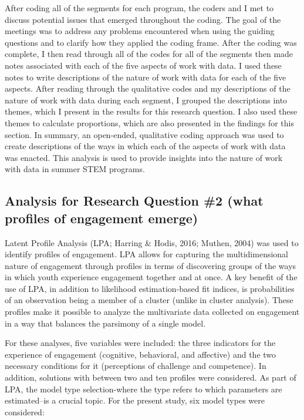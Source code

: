 \documentclass[]{book}
\theoremstyle{definition}
\theoremstyle{definition}
\theoremstyle{definition}
\theoremstyle{remark}
\begin{document}
After coding all of the segments for each program, the coders and I met
to discuss potential issues that emerged throughout the coding. The goal
of the meetings was to address any problems encountered when using the
guiding questions and to clarify how they applied the coding frame.
After the coding was complete, I then read through all of the codes for
all of the segments then made notes associated with each of the five
aspects of work with data. I used these notes to write descriptions of
the nature of work with data for each of the five aspects. After reading
through the qualitative codes and my descriptions of the nature of work
with data during each segment, I grouped the descriptions into themes,
which I present in the results for this research question. I also used
these themes to calculate proportions, which are also presented in the
findings for this section. In summary, an open-ended, qualitative coding
approach was used to create descriptions of the ways in which each of
the aspects of work with data was enacted. This analysis is used to
provide insights into the nature of work with data in summer STEM
programs.

\subsection{Analysis for Research Question \#2 (what profiles of
engagement
emerge)}\label{analysis-for-research-question-2-what-profiles-of-engagement-emerge}

Latent Profile Analysis (LPA; Harring \& Hodis, 2016; Muthen, 2004) was
used to identify profiles of engagement. LPA allows for capturing the
multidimensional nature of engagement through profiles in terms of
discovering groups of the ways in which youth experience engagement
together and at once. A key benefit of the use of LPA, in addition to
likelihood estimation-based fit indices, is probabilities of an
observation being a member of a cluster (unlike in cluster analysis).
These profiles make it possible to analyze the multivariate data
collected on engagement in a way that balances the parsimony of a single
model.

For these analyses, five variables were included: the three indicators
for the experience of engagement (cognitive, behavioral, and affective)
and the two necessary conditions for it (perceptions of challenge and
competence). In addition, solutions with between two and ten profiles
were considered. As part of LPA, the model type selection-where the type
refers to which parameters are estimated--is a crucial topic. For the
present study, six model types were considered:
\end{document}
